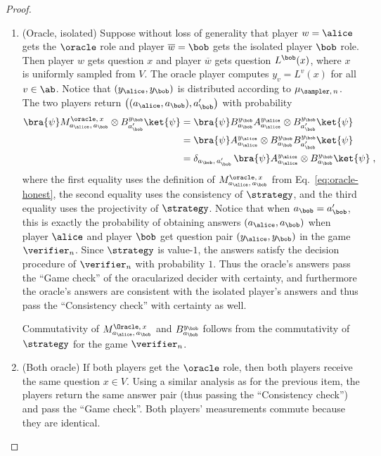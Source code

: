 \begin{proof}
  \begin{enumerate}
  \item ({Oracle, isolated}) Suppose without loss of generality that player
    $w=\alice$ gets the $\oracle$ role and player $\overline{w}=\bob$ gets the
    isolated player $\bob$ role.
    Then player $w$ gets question $x$ and player $\overline{w}$ gets question
    $L^\bob(x)$, where $x$ is uniformly sampled from $V$.
    The oracle player computes $y_v = L^v(x)$ for all $v \in \ab$.
    Notice that $(y_\alice, y_\bob)$ is distributed according to
    $\mu_{\sampler,\, n}$.
    The two players return $\bigl( (a_\alice, a_\bob), a'_\bob \bigr)$ with
    probability
    \begin{align*}
      \bra{\psi} M^{\oracle,\, x}_{a_\alice,\, a_\bob} \otimes
      B^{y_\bob}_{a'_\bob} \ket{\psi}
      & = \bra{\psi} B^{y_\bob}_{a_\bob} A^{y_\alice}_{a_\alice} \otimes
        B^{y_\bob}_{a'_\bob} \ket{\psi}\\
      & = \bra{\psi}  A^{y_\alice}_{a_\alice} \otimes
        B^{y_\bob}_{a_\bob} B^{y_\bob}_{a'_\bob} \ket{\psi}\\
      & = \delta_{a_\bob,\, a'_\bob}\, \bra{\psi} A^{y_\alice}_{a_\alice} \otimes
        B^{y_\bob}_{a_\bob} \ket{\psi}\;,
    \end{align*}
    where the first equality uses the definition of $M^{\oracle,\,
      x}_{a_\alice,\, a_\bob}$ from Eq.~\eqref{eq:oracle-honest}, the second
    equality uses the consistency of $\strategy$, and the third equality uses
    the projectivity of $\strategy$.
    Notice that when $a_\bob = a'_\bob$, this is exactly the probability of
    obtaining answers $(a_\alice,a_\bob)$ when player $\alice$ and player $\bob$
    get question pair $(y_\alice,y_\bob)$ in the game $\verifier_n$.
    Since $\strategy$ is value-$1$, the answers satisfy the decision procedure
    of $\verifier_n$ with probability $1$.
    Thus the oracle's answers pass the ``Game check'' of the oracularized
    decider with certainty, and furthermore the oracle's answers are consistent
    with the isolated player's answers and thus pass the ``Consistency check''
    with certainty as well.
	
    Commutativity of $M^{\Oracle,\, x}_{a_\alice,\, a_\bob}$ and
    $B^{y_\bob}_{a_\bob}$ follows from the commutativity of $\strategy$ for the
    game $\verifier_n$.

  \item ({Both oracle}) If both players get the $\oracle$ role, then both
    players receive the same question $x \in V$.
    Using a similar analysis as for the previous item, the players return the
    same answer pair (thus passing the ``Consistency check'') and pass the
    ``Game check''.
    Both players' measurements commute because they are identical.


\end{enumerate}
\end{proof}
